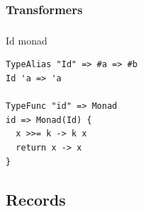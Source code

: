 \subsubsection{Transformers}
\begin{frame}[fragile]
   \frametitle{\subsecname}
   \framesubtitle{\subsubsecname}
   Id monad
   \begin{lstlisting}
TypeAlias "Id" => #a => #b
Id 'a => 'a

TypeFunc "id" => Monad
id => Monad(Id) {
  x >>= k -> k x
  return x -> x
}
   \end{lstlisting}
\end{frame}

\subsection{Records}

